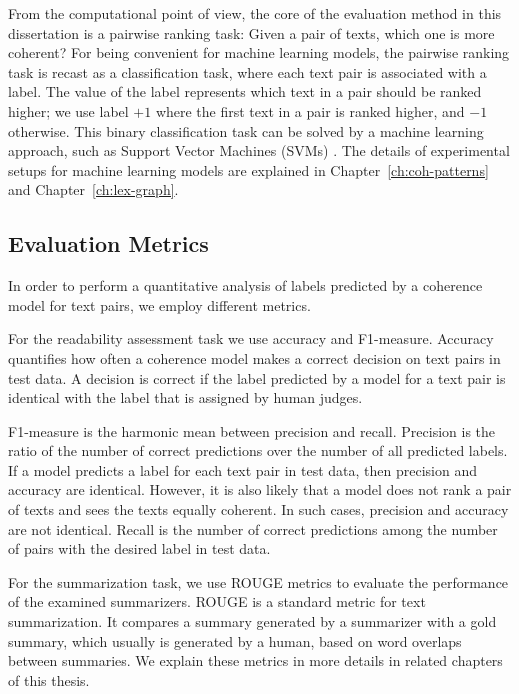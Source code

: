 From the computational point of view, the core of the evaluation method in this dissertation is a pairwise ranking task: Given a pair of texts, which one is more coherent? 
For being convenient for machine learning models, the pairwise ranking task is recast as a classification task, where each text pair is associated with a label. 
The value of the label represents which text in a pair should be ranked higher; we use label $+1$ where the first text in a pair is ranked higher, and $-1$ otherwise. 
This binary classification task can be solved by a machine learning approach, such as Support Vector Machines (SVMs) \cite{bishop06}.  
The details of experimental setups for machine learning models are explained in Chapter~\ref{ch:coh-patterns} and Chapter~\ref{ch:lex-graph}.  

\subsection{Evaluation Metrics}

In order to perform a quantitative analysis of labels predicted by a coherence model for text pairs, we employ different metrics.

For the readability assessment task we use accuracy and F1-measure. 
Accuracy quantifies how often a coherence model makes a correct decision on text pairs in test data.
A decision is correct if the label predicted by a model for a text pair is identical with the label that is assigned by human judges.

F1-measure is the harmonic mean between precision and recall. 
Precision is the ratio of the number of correct predictions over the number of all predicted labels. 
If a model predicts a label for each text pair in test data, then precision and accuracy are identical. 
However, it is also likely that a model does not rank a pair of texts and sees the texts equally coherent.  
In such cases, precision and accuracy are not identical.    
Recall is the number of correct predictions among the number of pairs with the desired label in test data. 

For the summarization task, we use ROUGE metrics to evaluate the performance of the examined summarizers. 
ROUGE is a standard metric for text summarization. It compares a summary generated by a summarizer with a gold summary, which usually is generated by a human, based on word overlaps between summaries. 
We explain these metrics in more details in related chapters of this thesis. 

